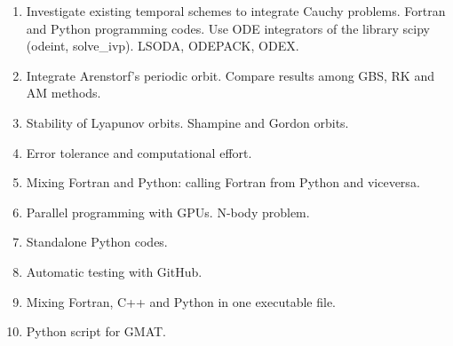 \documentclass[12pt, a4paper]{article}
\begin{document}
\begin{itemize}
 \begin{enumerate} 
    
     \item Investigate existing temporal schemes to integrate Cauchy problems. 
     Fortran and Python programming codes.  
     Use ODE integrators of the library scipy (odeint, solve\_ivp). 
     LSODA, ODEPACK, ODEX.  
     \item Integrate Arenstorf's periodic orbit. Compare results among GBS, RK and 
     AM methods.  
     \item Stability of Lyapunov orbits.  Shampine and Gordon orbits.
     \item Error tolerance and computational effort. 
     \item Mixing Fortran and Python: calling Fortran from Python and viceversa.
     \item Parallel programming with GPUs. N-body problem. 
     \item Standalone Python codes.  
     \item Automatic testing with GitHub.
     \item Mixing Fortran, C++ and Python in one executable file.
     \item Python script for GMAT. 
 \end{enumerate}






 
 
\end{itemize}
\end{document}
